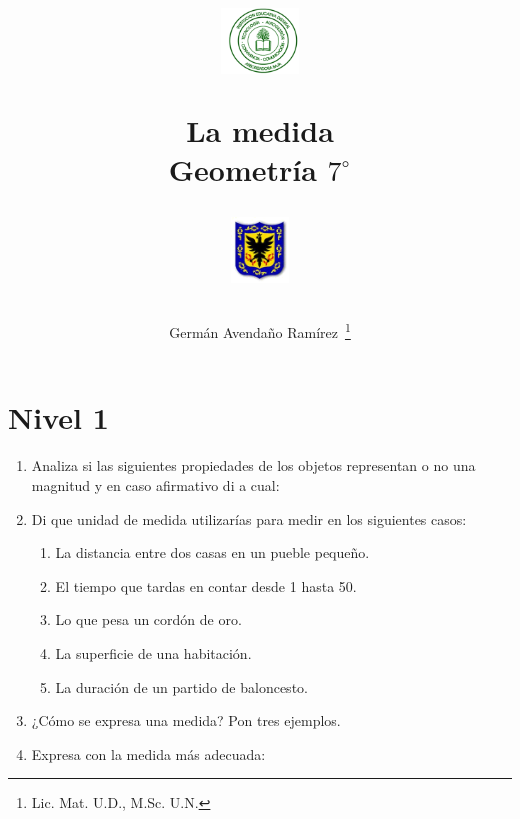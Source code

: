 \documentclass[twoside]{article}
\author{Germ\'an Avenda\~no Ram\'irez~\thanks{Lic. Mat. U.D., M.Sc. U.N.}}
\title{\begin{minipage}{.2\textwidth}
\includegraphics[height=1.75cm]{Images/logo-colegio.png}\end{minipage}
\begin{minipage}{.55\textwidth}
\begin{center}
La medida\\
Geometría $7^{\circ}$
\end{center}
\end{minipage}\hfill
\begin{minipage}{.2\textwidth}
\includegraphics[height=1.75cm]{Images/logo-sed.png} 
\end{minipage}}
\date{}
\begin{document}
\maketitle
\begin{minipage}{.95\textwidth}
\end{minipage}
\section*{Nivel 1}
\begin{enumerate}
\item Analiza si las siguientes propiedades de los objetos representan o no una magnitud y en caso afirmativo di a cual:
\begin{enumerate}
\end{enumerate}
\item Di que unidad de medida utilizarías para medir en los siguientes casos:
\begin{enumerate}
\item La distancia entre dos casas en un pueble pequeño.
\item El tiempo que tardas en contar desde 1 hasta 50.
\item Lo que pesa un cordón de oro.
\item La superficie de una habitación.
\item La duración de un partido de baloncesto.
\end{enumerate}
\item ¿Cómo se expresa una medida? Pon tres ejemplos.
\item Expresa con la medida más adecuada:
\begin{enumerate}

\end{enumerate}
\end{enumerate}
\end{document}
